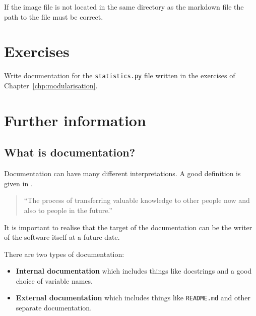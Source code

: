 \begin{note}

If the image file is not located in the same directory as the markdown file the
path to the file must be correct.
\end{note}




\section{Exercises}
\label{\detokenize{building-tools/06-documentation/exercises/main:exercises}}\label{\detokenize{building-tools/06-documentation/exercises/main:documentation-exercises}}\label{\detokenize{building-tools/06-documentation/exercises/main::doc}}

Write documentation for the \texttt{statistics.py} file written in the exercises of
Chapter~\ref{chp:modularisation}.


\section{Further information}
\label{\detokenize{building-tools/06-documentation/why/main:further-information}}\label{\detokenize{building-tools/06-documentation/why/main:documentation-further-information}}\label{\detokenize{building-tools/06-documentation/why/main::doc}}

\subsection{What is documentation?}
\label{\detokenize{building-tools/06-documentation/why/main:what-is-documentation}}

Documentation can have many different interpretations. A good definition is
given in \cite{martraire2019living}.

\begin{quote}
``The process of transferring valuable knowledge to other people now and also to
people in the future.''
\end{quote}

\begin{note}
It is important to realise that the target of the documentation can be the
writer of the software itself at a future date.
\end{note}


There are two types of documentation:
\begin{itemize}
\item 

\textbf{Internal documentation} which includes things like docstrings and a good
choice of variable names.

\item 

\textbf{External documentation} which includes things like \texttt{README.md} and other
separate documentation.

\end{itemize}


